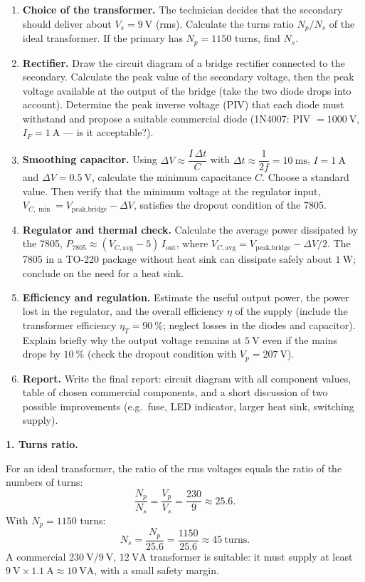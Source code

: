 \documentclass[11pt]{article}
\newcounter{popsec}
\newcounter{popsub}
\newcommand{\courssub}[1]{%
  \stepcounter{popsub}%
  \par\vspace{9pt}\noindent{\popxbold\fontsize{11.5}{13}\selectfont\color{popink}{\color{poporange}\thepopsec.\thepopsub}\hspace{6pt}#1}\par\nopagebreak\vspace{4pt}
}
\begin{document}
\begin{enumerate}
\item \textbf{Choice of the transformer.} The technician decides that the secondary should deliver about $V_s = 9\ \mathrm{V}$ (rms). Calculate the turns ratio $N_p/N_s$ of the ideal transformer. If the primary has $N_p = 1150$ turns, find $N_s$.
\item \textbf{Rectifier.} Draw the circuit diagram of a bridge rectifier connected to the secondary. Calculate the peak value of the secondary voltage, then the peak voltage available at the output of the bridge (take the two diode drops into account). Determine the peak inverse voltage (PIV) that each diode must withstand and propose a suitable commercial diode (1N4007: PIV $= 1000\ \mathrm{V}$, $I_F = 1\ \mathrm{A}$ — is it acceptable?).
\item \textbf{Smoothing capacitor.} Using $\Delta V \approx \dfrac{I\,\Delta t}{C}$ with $\Delta t \approx \dfrac{1}{2f} = 10\ \mathrm{ms}$, $I = 1\ \mathrm{A}$ and $\Delta V = 0.5\ \mathrm{V}$, calculate the minimum capacitance $C$. Choose a standard value. Then verify that the minimum voltage at the regulator input, $V_{C,\min} = V_{\text{peak,bridge}} - \Delta V$, satisfies the dropout condition of the 7805.
\item \textbf{Regulator and thermal check.} Calculate the average power dissipated by the 7805, $P_{7805} \approx (V_{C,\text{avg}} - 5)\,I_{\text{out}}$, where $V_{C,\text{avg}} = V_{\text{peak,bridge}} - \Delta V/2$. The 7805 in a TO-220 package without heat sink can dissipate safely about $1\ \mathrm{W}$; conclude on the need for a heat sink.
\item \textbf{Efficiency and regulation.} Estimate the useful output power, the power lost in the regulator, and the overall efficiency $\eta$ of the supply (include the transformer efficiency $\eta_T = 90\ \%$; neglect losses in the diodes and capacitor). Explain briefly why the output voltage remains at $5\ \mathrm{V}$ even if the mains drops by $10\ \%$ (check the dropout condition with $V_p = 207\ \mathrm{V}$).
\item \textbf{Report.} Write the final report: circuit diagram with all component values, table of chosen commercial components, and a short discussion of two possible improvements (e.g.\ fuse, LED indicator, larger heat sink, switching supply).
\end{enumerate}

\courssub{Model answer}

\textbf{1. Turns ratio.}\par
For an ideal transformer, the ratio of the rms voltages equals the ratio of the numbers of turns:
\[
\frac{N_p}{N_s} = \frac{V_p}{V_s} = \frac{230}{9} \approx 25.6.
\]
With $N_p = 1150$ turns:
\[
N_s = \frac{N_p}{25.6} = \frac{1150}{25.6} \approx 45\ \text{turns}.
\]
A commercial $230\ \mathrm{V}/9\ \mathrm{V}$, $12\ \mathrm{VA}$ transformer is suitable: it must supply at least $9\ \mathrm{V} \times 1.1\ \mathrm{A} \approx 10\ \mathrm{VA}$, with a small safety margin.
\end{document}
